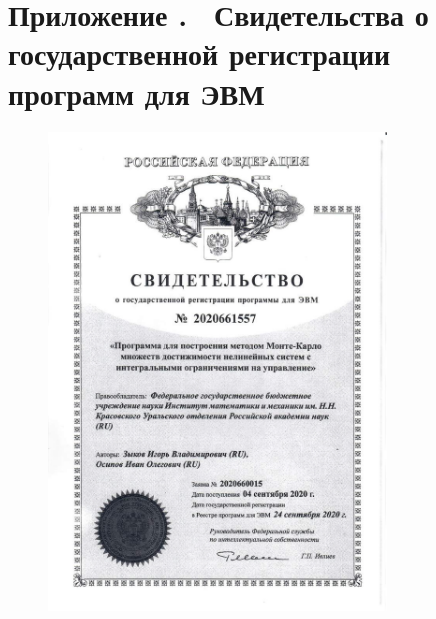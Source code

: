 \documentclass[../main.tex]{subfiles}
\begin{document}
\clearpage
{}
\section*{Приложение .  Свидетельства о государственной регистрации программ для ЭВМ}%
\label{app:B}%
\renewcommand{\theequation}{\Alph{section}.\arabic{equation}}%
\setcounter{equation}{0}
   	\begin{figure}[h]
   		\centering
   			\includegraphics[width=0.8\textwidth]{images/ZykovOsipovPatent.jpg}
   	\end{figure}
\end{document}

